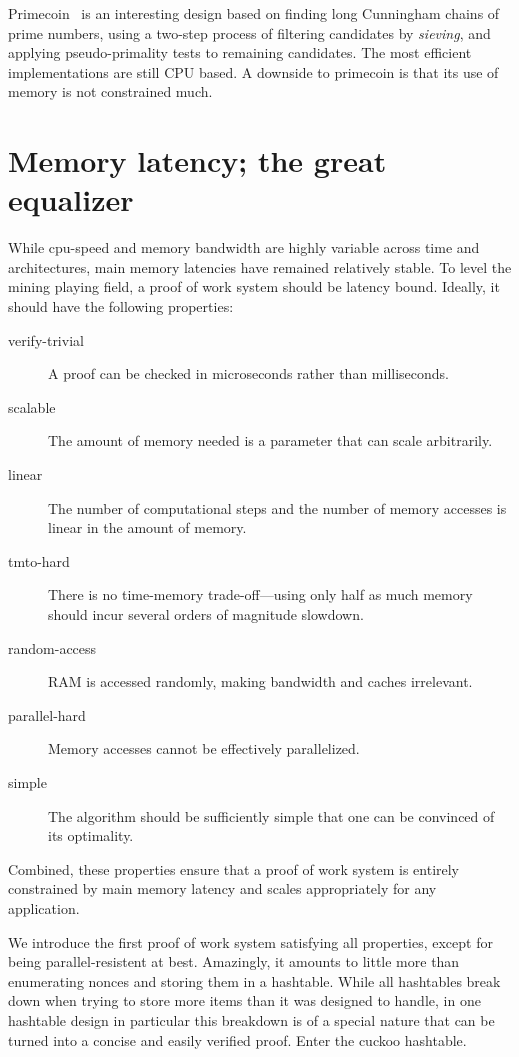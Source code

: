 \documentclass[11pt, oneside]{article}
\begin{document}
Primecoin~\cite{king2013} is an interesting design based on finding long Cunningham chains
of prime numbers, using a two-step process of filtering candidates by {\em sieving}, and applying
pseudo-primality tests to remaining candidates. The most efficient implementations are still CPU based.
A downside to primecoin is that its use of memory is not constrained much.

\section{Memory latency; the great equalizer}
While cpu-speed and memory bandwidth are highly variable across time and architectures,
main memory latencies have remained relatively stable.
To level the mining playing field, a proof of work system should be latency bound.
Ideally, it should have the following properties:
\begin{description}
\item[verify-trivial] A proof can be checked in microseconds rather than milliseconds.
\item[scalable] The amount of memory needed is a parameter that can scale arbitrarily.
\item[linear] The number of computational steps and the number of memory accesses is linear in the amount of memory.
\item[tmto-hard] There is no time-memory trade-off---using only half as much memory should
incur several orders of magnitude slowdown.
\item[random-access] RAM is accessed randomly, making bandwidth and caches irrelevant.
\item[parallel-hard] Memory accesses cannot be effectively parallelized.
\item[simple] The algorithm should be sufficiently simple that one can be convinced of its optimality.
\end{description}
Combined, these properties ensure that a proof of work system is entirely constrained by main
memory latency and scales appropriately for any application.

We introduce the first proof of work system satisfying all properties,
except for being parallel-resistent at best.
Amazingly, it amounts to little more than enumerating nonces and storing them
in a hashtable. While all hashtables break down when trying to store more items than
it was designed to handle, in one hashtable design in particular this breakdown
is of a special nature that can be turned into a concise and easily verified proof.
Enter the cuckoo hashtable.
\end{document}
